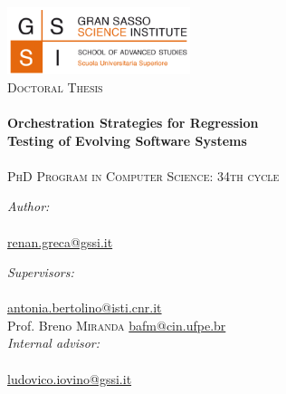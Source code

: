 \documentclass[11pt, a4paper, twoside]{Thesis} %
\begin{document}
\begin{titlepage}
\begin{center}

\includegraphics[width=0.4\textwidth]{./figures/logo_GSSI}~\\[1cm]
\textsc{\Large Doctoral Thesis}\\[0.5cm] %

\HRule \\[0.1cm] %
{\huge \bfseries  Orchestration Strategies for Regression\\[0.3cm] Testing of Evolving Software Systems }\\[0.3cm] %
\HRule \\[0.9cm] %

{\Large \textsc{PhD Program in Computer Science: 34th cycle}}\\[2cm]

\begin{minipage}{0.4\textwidth}
\begin{flushleft} \large
\emph{Author:}\\
\bigskip \authornames \\
\href{mailto:renan.greca@gssi.it}{renan.greca@gssi.it}
\end{flushleft}
\end{minipage}
\begin{minipage}{0.5\textwidth}
\begin{flushright} \large
\emph{Supervisors:} \\
\bigskip \supname \\
\href{mailto:antonia.bertolino@isti.cnr.it}{antonia.bertolino@isti.cnr.it} \\
Prof. Breno \textsc{Miranda}
\href{mailto:bafm@cin.ufpe.br}{bafm@cin.ufpe.br} \\
\bigskip \bigskip
\emph{Internal advisor:} \\
\bigskip \examname \\
\href{mailto:ludovico.iovino@gssi.it}{ludovico.iovino@gssi.it}
\end{flushright}
\end{minipage}\\[2.0cm]
 

\end{center}
\end{titlepage}
\end{document}

